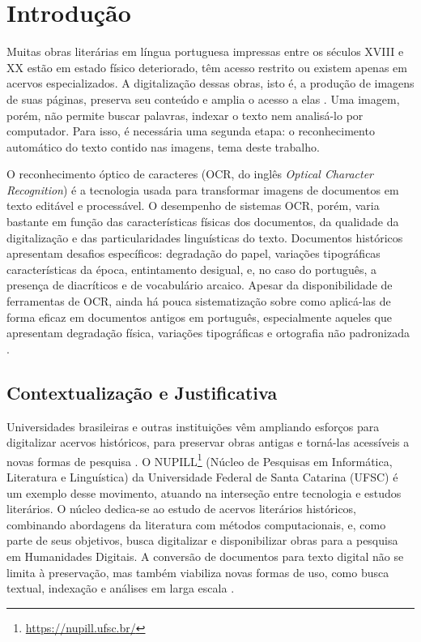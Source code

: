 \documentclass[noabntexcite,oneside]{ufsc-thesis-rn46-2019}
\begin{document}
\chapter{Introdução}

Muitas obras literárias em língua portuguesa impressas entre os séculos XVIII e XX
estão em estado físico deteriorado, têm acesso restrito ou existem apenas em acervos
especializados. A digitalização dessas obras, isto é, a produção de imagens de suas
páginas, preserva seu conteúdo e amplia o acesso a elas \cite{terras2013}. Uma imagem,
porém, não permite buscar palavras, indexar o texto nem analisá-lo por computador. Para
isso, é necessária uma segunda etapa: o reconhecimento automático do texto contido nas
imagens, tema deste trabalho.

O reconhecimento óptico de caracteres (OCR, do inglês \textit{Optical Character Recognition})
é a tecnologia usada para transformar imagens de documentos em texto editável e
processável. O desempenho de sistemas OCR, porém, varia bastante em função das características físicas dos documentos, da qualidade da digitalização e
das particularidades linguísticas do texto. Documentos históricos apresentam desafios
específicos: degradação do papel, variações tipográficas características da época,
entintamento desigual, e, no caso do português, a presença de diacríticos e de
vocabulário arcaico.
Apesar da disponibilidade de ferramentas de OCR, ainda há pouca sistematização sobre como aplicá-las de forma eficaz em documentos
antigos em português, especialmente aqueles que apresentam degradação física, variações tipográficas e ortografia não padronizada \cite{santos2023}.

\section{Contextualização e Justificativa}

Universidades brasileiras e outras instituições vêm ampliando esforços para digitalizar
acervos históricos, para preservar obras antigas e torná-las acessíveis a novas formas
de pesquisa \cite{terras2013}. O
NUPILL\footnote{\url{https://nupill.ufsc.br/}} (Núcleo de Pesquisas em Informática,
Literatura e Linguística) da Universidade
Federal de Santa Catarina (UFSC) é um exemplo desse movimento, atuando na interseção
entre tecnologia e estudos literários.
O núcleo dedica-se ao estudo de acervos literários históricos,
combinando abordagens da literatura com métodos computacionais, e, como parte de seus
objetivos, busca digitalizar e disponibilizar obras para a pesquisa em Humanidades
Digitais.
A conversão de documentos para texto digital não se limita à preservação, mas
também viabiliza novas formas de uso, como busca textual, indexação e análises em larga
escala \cite{burdick2012}.
\end{document}
